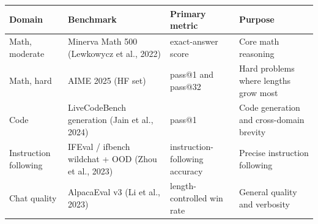 \documentclass[border=8pt]{standalone}
\begin{document}
\begin{minipage}{8.8in}
\color{textdark}
\small
\renewcommand{\arraystretch}{1.15}
\begin{tabular}{llll}
\toprule
\textbf{Domain} & \textbf{Benchmark} & \textbf{Primary metric} & \textbf{Purpose}\\
\midrule
Math, moderate & Minerva Math 500 (Lewkowycz et al., 2022) & exact-answer score & Core math reasoning\\
Math, hard & AIME 2025 (HF set) & pass@1 and pass@32 & Hard problems where lengths grow most\\
Code & LiveCodeBench generation (Jain et al., 2024) & pass@1 & Code generation and cross-domain brevity\\
Instruction following & IFEval / ifbench wildchat + OOD (Zhou et al., 2023) & instruction-following accuracy & Precise instruction following\\
Chat quality & AlpacaEval v3 (Li et al., 2023) & length-controlled win rate & General quality and verbosity\\
\bottomrule
\end{tabular}
\end{minipage}
\end{document}
